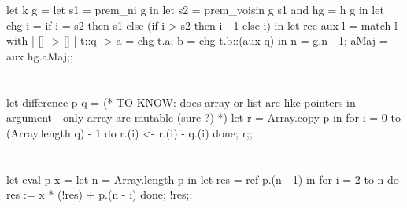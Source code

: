 \documentclass{article}
\begin{document}
		\section{}
		
			\begin{case}
let k g =
	let s1 = prem_ni g in
	let s2 = prem_voisin g s1 and hg = h g in
	let chg i = if i = s2 then s1 else (if i > s2 then i - 1 else i) in
	let rec aux l = match l with
	| [] -> []
	| t::q -> {a = chg t.a; b = chg t.b}::(aux q)
	in {n = g.n - 1; aMaj = aux hg.aMaj};;
			\end{case}
			
		\section{}
		
			
			
		\section{}
		
			
			
		\section{}
		
			
			
		\section{}
		
			
			
		\section{}
		
			\begin{case}
let difference p q = (* TO KNOW: does array or list are like pointers in argument - only array are mutable (sure ?) *)
	let r = Array.copy p in
	for i = 0 to (Array.length q) - 1 do
		r.(i) <- r.(i) - q.(i)
	done;
	r;;
			\end{case}
			
		\section{}
		
			\begin{case}

			\end{case}
			
		\section{}
		
			\begin{case}
let eval p x =
	let n = Array.length p in
	let res = ref p.(n - 1) in
	for i = 2 to n do
		res := x * (!res) + p.(n - i)
	done;
	!res;;
			\end{case}
			
		\section{}
		
			\begin{case}

			\end{case}
		
\end{document}

